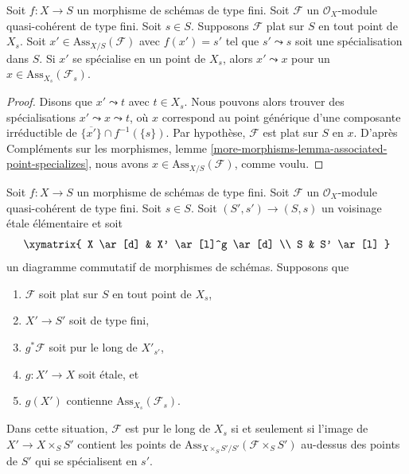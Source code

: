 \begin{lemma}
\label{lemma-associated-point-specializes}
Soit $f : X \to S$ un morphisme de schémas de type fini.
Soit $\mathcal{F}$ un $\mathcal{O}_X$-module quasi-cohérent de type fini.
Soit $s \in S$.
Supposons $\mathcal{F}$ plat sur $S$ en tout point de $X_s$.
Soit $x' \in \text{Ass}_{X/S}(\mathcal{F})$ avec $f(x') = s'$
tel que $s' \leadsto s$ soit une spécialisation dans $S$. Si
$x'$ se spécialise en un point de $X_s$, alors $x' \leadsto x$
pour un $x \in \text{Ass}_{X_s}(\mathcal{F}_s)$.
\end{lemma}

\begin{proof}
Disons que $x' \leadsto t$ avec $t \in X_s$. Nous pouvons alors trouver des spécialisations
$x' \leadsto x \leadsto t$, où $x$ correspond au point générique
d'une composante irréductible de
$\overline{\{x'\}} \cap f^{-1}(\{s\})$. Par hypothèse, $\mathcal{F}$ est plat
sur $S$ en $x$. D'après Compléments sur les morphismes, lemme
\ref{more-morphisms-lemma-associated-point-specializes},
nous avons $x \in \text{Ass}_{X/S}(\mathcal{F})$, comme voulu.
\end{proof}

\begin{lemma}
\label{lemma-criterion}
Soit $f : X \to S$ un morphisme de schémas de type fini.
Soit $\mathcal{F}$ un $\mathcal{O}_X$-module quasi-cohérent
de type fini. Soit $s \in S$. Soit $(S', s') \to (S, s)$ un
voisinage \'etale élémentaire et soit
$$
\xymatrix{
X \ar[d] & X' \ar[l]^g \ar[d] \\
S & S' \ar[l]
}
$$
un diagramme commutatif de morphismes de schémas. Supposons que
\begin{enumerate}
\item $\mathcal{F}$ soit plat sur $S$ en tout point de $X_s$,
\item $X' \to S'$ soit de type fini,
\item $g^*\mathcal{F}$ soit pur le long de $X'_{s'}$,
\item $g : X' \to X$ soit \'etale, et
\item $g(X')$ contienne $\text{Ass}_{X_s}(\mathcal{F}_s)$.
\end{enumerate}
Dans cette situation, $\mathcal{F}$ est pur le long de $X_s$ si et seulement
si l'image de $X' \to X \times_S S'$ contient les points de
$\text{Ass}_{X \times_S S'/S'}(\mathcal{F} \times_S S')$
au-dessus des points de $S'$ qui se spécialisent en $s'$.
\end{lemma}

